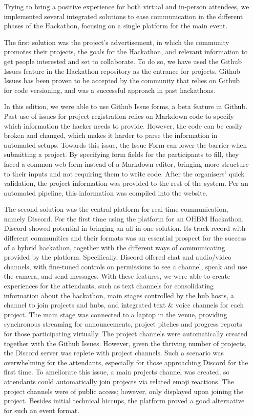\documentclass[10pt,a4paper,twocolumns]{proc}
\begin{document}
Trying to bring a positive experience for both virtual and in-person
attendees, we implemented several integrated solutions to ease
communication in the different phases of the Hackathon, focusing on a
single platform for the main event.

The first solution was the project's advertisement, in which the
community promotes their projects, the goals for the Hackathon, and
relevant information to get people interested and set to collaborate. To
do so, we have used the Github Issues feature in the Hackathon
repository as the entrance for projects. Github Issues has been proven
to be accepted by the community that relies on Github for code
versioning, and was a successful approach in past hackathons.

In this edition, we were able to use Github Issue forms, a beta feature
in Github. Past use of issues for project registration relies on
Markdown code to specify which information the hacker needs to provide.
However, the code can be easily broken and changed, which makes it
harder to parse the information in automated setups. Towards this issue,
the Issue Form can lower the barrier when submitting a project. By
specifying form fields for the participants to fill, they faced a common
web form instead of a Markdown editor, bringing more structure to their
inputs and not requiring them to write code. After the organisers' quick
validation, the project information was provided to the rest of the
system. Per an automated pipeline, this information was compiled into
the website.

The second solution was the central platform for real-time
communication, namely Discord. For the first time using the platform for
an OHBM Hackathon, Discord showed potential in bringing an all-in-one
solution. Its track record with different communities and their formats
was an essential prospect for the success of a hybrid hackathon,
together with the different ways of communicating provided by the
platform. Specifically, Discord offered chat and audio/video channels,
with fine-tuned controls on permissions to see a channel, speak and use
the camera, and send messages. With these features, we were able to
create experiences for the attendants, such as text channels for
consolidating information about the hackathon, main stages controlled by
the hub hosts, a channel to join projects and hubs, and integrated text
\& voice channels for each project. The main stage was connected to a
laptop in the venue, providing synchronous streaming for announcements,
project pitches and progress reports for those participating virtually.
The project channels were automatically created together with the Github
Issues. However, given the thriving number of projects, the Discord
server was replete with project channels. Such a scenario was
overwhelming for the attendants, especially for those approaching
Discord for the first time. To ameliorate this issue, a main projects
channel was created, so attendants could automatically join projects via
related emoji reactions. The project channels were of public access;
however, only displayed upon joining the project. Besides initial
technical hiccups, the platform proved a good alternative for such an
event format.
\end{document}
